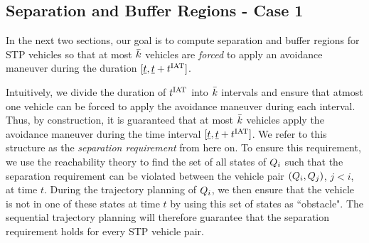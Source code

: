 \subsection{Separation and Buffer Regions - Case 1} \label{sec:case1}
In the next two sections, our goal is to compute separation and buffer regions for STP vehicles so that %
at most $\bar{k}$ vehicles are \textit{forced} to apply an avoidance maneuver during the duration $[\underline{t}, \underline{t}+t^\text{IAT}]$. 

Intuitively, we divide the duration of $t^\text{IAT}$ into $\bar{k}$ intervals and ensure that atmost one vehicle can be forced to apply the avoidance maneuver during each interval. Thus, by construction, it is guaranteed that at most $\bar{k}$ vehicles apply the avoidance maneuver during the time interval $[\underline{t}, \underline{t}+t^\text{IAT}]$. We refer to this structure as the \textit{separation requirement} from here on. To ensure this requirement, we use the reachability theory to find the set of all states of $Q_i$ such that the separation requirement can be violated between the vehicle pair $(Q_i, Q_j)$, $j<i$, at time $t$. During the trajectory planning of $Q_i$, we then ensure that the vehicle is not in one of these states at time $t$ by using this set of states as ``obstacle". The sequential trajectory planning will therefore guarantee that the separation requirement holds for every STP vehicle pair.


